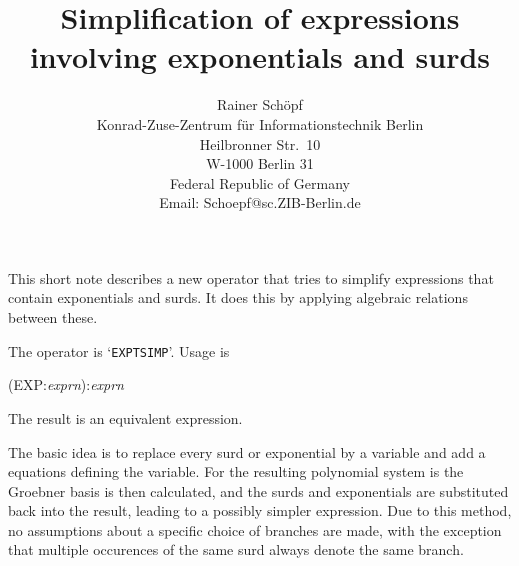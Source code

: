 \newcommand{\MACSYMA}{{\sf MACSYMA}}
\newcommand{\MAPLE}{{\sf MAPLE}}
\newcommand{\Mathematica}{{\sf Mathematica}}
\newcommand{\PSL}{{\sf PSL}}
\title{Simplification of expressions \\
       involving exponentials and surds}
\date{}
\author{Rainer Sch\"opf\\
        Konrad-Zuse-Zentrum f\"ur Informationstechnik Berlin\\
        Heilbronner Str.\ 10\\
        W-1000 Berlin 31\\
        Federal Republic of Germany\\
        Email: Schoepf@sc.ZIB-Berlin.de}

\maketitle

This short note describes a new \REDUCE{} operator that tries to
simplify expressions that contain exponentials and surds. It does this
by applying algebraic relations between these.

The operator is `\verb+EXPTSIMP+'. Usage is

(EXP:{\em exprn}):{\em exprn}

The result is an equivalent expression.

 The basic idea is to replace every surd or
exponential by a variable and add a equations defining the variable.
For the resulting polynomial system is the Groebner basis is then
calculated, and the surds and exponentials are substituted back into
the result, leading to a possibly simpler expression.  Due to this
method, no assumptions about a specific choice of branches are made,
with the exception that multiple occurences of the same surd always
denote the same branch.


